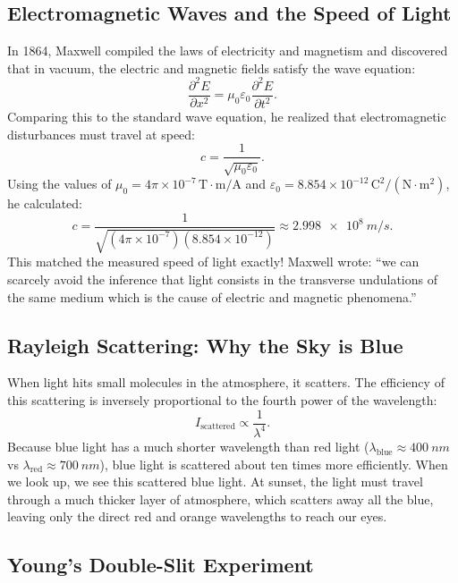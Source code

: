 \subsection{Electromagnetic Waves and the Speed of Light}

In 1864, Maxwell compiled the laws of electricity and magnetism and discovered that in vacuum, the electric and magnetic fields satisfy the wave equation:
\begin{equation}
    \frac{\partial^2 E}{\partial x^2} = \mu_0\varepsilon_0 \frac{\partial^2 E}{\partial t^2}.
\end{equation}
Comparing this to the standard wave equation, he realized that electromagnetic disturbances must travel at speed:
\begin{equation}
    c = \frac{1}{\sqrt{\mu_0\varepsilon_0}}.
\end{equation}
Using the values of $\mu_0 = 4\pi\times10^{-7}\,\mathrm{T\cdot m/A}$ and $\varepsilon_0 = 8.854\times10^{-12}\,\mathrm{C^2/(N\cdot m^2)}$, he calculated:
\begin{equation}
    c = \frac{1}{\sqrt{(4\pi\times10^{-7})(8.854\times10^{-12})}} \approx \SI{2.998e8}{m/s}.
\end{equation}
This matched the measured speed of light exactly! Maxwell wrote: ``we can scarcely avoid the inference that light consists in the transverse undulations of the same medium which is the cause of electric and magnetic phenomena.''

\subsection{Rayleigh Scattering: Why the Sky is Blue}

When light hits small molecules in the atmosphere, it scatters. The efficiency of this scattering is inversely proportional to the fourth power of the wavelength:
\begin{equation}
    I_{\text{scattered}} \propto \frac{1}{\lambda^4}.
\end{equation}
Because blue light has a much shorter wavelength than red light ($\lambda_{\text{blue}} \approx \SI{400}{nm}$ vs $\lambda_{\text{red}} \approx \SI{700}{nm}$), blue light is scattered about ten times more efficiently. When we look up, we see this scattered blue light. At sunset, the light must travel through a much thicker layer of atmosphere, which scatters away all the blue, leaving only the direct red and orange wavelengths to reach our eyes.

\subsection{Young's Double-Slit Experiment}

